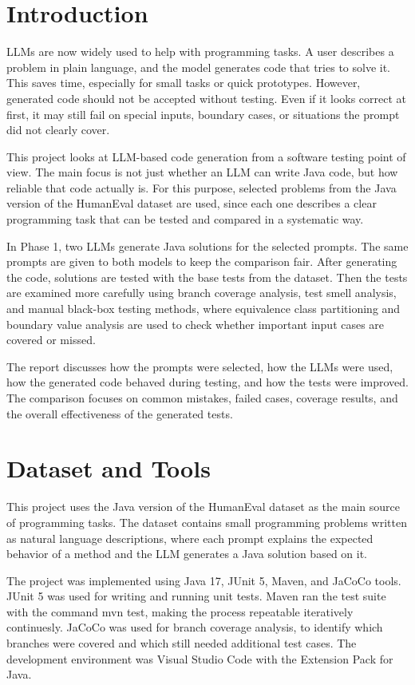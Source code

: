 \documentclass[journal]{IEEEtran}
\begin{document}
\section{Introduction}
LLMs are now widely used to help with programming tasks. A user describes a problem in plain language, and the model generates code that tries to solve it. This saves time, especially for small tasks or quick prototypes. However, generated code should not be accepted without testing. Even if it looks correct at first, it may still fail on special inputs, boundary cases, or situations the prompt did not clearly cover.

This project looks at LLM-based code generation from a software testing point of view. The main focus is not just whether an LLM can write Java code, but how reliable that code actually is. For this purpose, selected problems from the Java version of the HumanEval dataset are used, since each one describes a clear programming task that can be tested and compared in a systematic way.

In Phase 1, two LLMs generate Java solutions for the selected prompts. The same prompts are given to both models to keep the comparison fair. After generating the code, solutions are tested with the base tests from the dataset. Then the tests are examined more carefully using branch coverage analysis, test smell analysis, and manual black-box testing methods, where equivalence class partitioning and boundary value analysis are used to check whether important input cases are covered or missed.

The report discusses how the prompts were selected, how the LLMs were used, how the generated code behaved during testing, and how the tests were improved. The comparison focuses on common mistakes, failed cases, coverage results, and the overall effectiveness of the generated tests.


\section{Dataset and Tools}
This project uses the Java version of the HumanEval dataset as the main source of programming tasks. The dataset contains small programming problems written as natural language descriptions, where each prompt explains the expected behavior of a method and the LLM generates a Java solution based on it. 

The project was implemented using Java 17, JUnit 5, Maven, and JaCoCo tools. JUnit 5 was used for writing and running unit tests. Maven ran the test suite with the command mvn test, making the process repeatable iteratively continuesly. JaCoCo was used for branch coverage analysis, to identify which branches were covered and which still needed additional test cases. The development environment was Visual Studio Code with the Extension Pack for Java.
\end{document}
